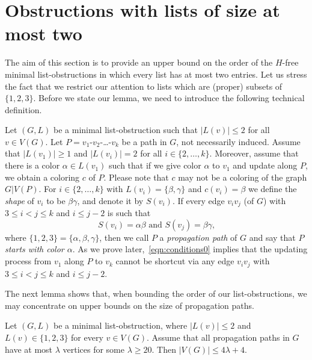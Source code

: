 \documentclass[11pt]{article}
\begin{document}
\section{Obstructions with lists of size at most two}\label{sec:smalllists}

The aim of this section is to provide an upper bound on the order of the $H$-free minimal list-obstructions in which every list has at most two entries.
Let us stress the fact that we restrict our attention to lists which are (proper) subsets of $\{1,2,3\}$.
Before we state our lemma, we need to introduce the following technical definition.

Let $(G,L)$ be a minimal list-obstruction such that $|L(v)|\le 2$ for all $v \in V(G)$.
Let $P=v_1$-$v_2$-\ldots-$v_k$ be a path in $G$, not necessarily induced.
Assume that $|L(v_1)|\ge 1$ and $|L(v_i)|=2$ for all $i \in \{2,\ldots,k\}$.
Moreover, assume that there is a color $\alpha \in L(v_1)$ such that if we give color $\alpha$ to $v_1$ and update along $P$, we obtain a coloring $c$ of $P$. Please note that $c$ may not be a coloring of the graph $G|V(P)$.
For $i \in\{2,\ldots,k\}$ with $L(v_i)=\{\beta,\gamma\}$ and $c(v_i)=\beta$ we 
define the {\em shape} of $v_i$ to be $\beta \gamma$, and denote it by
$S(v_i)$.
If every edge $v_iv_j$ (of $G$) with $3 \le i < j \le k$ and $i \le j-2$ is such that 
\begin{equation}\label{eqn:conditions0}
\mbox{$S(v_i)=\alpha\beta$ and $S(v_j)=\beta\gamma$,} 
\end{equation}
where $\{1,2,3\} = \{\alpha,\beta,\gamma\}$, then we call $P$ a \emph{propagation path} of $G$ and say that \emph{$P$ starts with color $\alpha$}.
As we prove later,~\eqref{eqn:conditions0} implies that the updating process from $v_1$ along $P$ to $v_k$ cannot be shortcut via any edge $v_iv_j$ with $3 \le i < j \le k$ and $i \le j-2$.

The next lemma shows that, when bounding the order of our list-obstructions, we may concentrate on upper bounds on the size of propagation paths.

\begin{lemma}\label{lem:propagationpath}
Let $(G,L)$ be a minimal list-obstruction, where $|L(v)| \leq 2$ and $L(v) \in \{1,2,3\}$  for every $v \in V(G)$.
Assume that all propagation paths in $G$ have at most $\lambda$ vertices for some $\lambda \ge 20$.
Then $|V(G)| \leq 4\lambda+4$.
\end{lemma}
\end{document}
